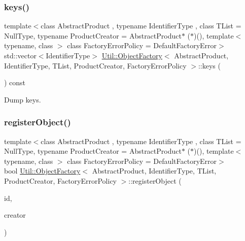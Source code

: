 \subsubsection{\texorpdfstring{keys()}{keys()}\hspace{0.1cm}{\footnotesize\ttfamily [2/2]}}
{\footnotesize\ttfamily template$<$class Abstract\+Product , typename Identifier\+Type , class T\+List  = Null\+Type, typename Product\+Creator  = Abstract\+Product$\ast$ ($\ast$)(), template$<$ typename, class $>$ class Factory\+Error\+Policy = Default\+Factory\+Error$>$ \\
std\+::vector$<$Identifier\+Type$>$ \mbox{\hyperlink{classUtil_1_1ObjectFactory}{Util\+::\+Object\+Factory}}$<$ Abstract\+Product, Identifier\+Type, T\+List, Product\+Creator, Factory\+Error\+Policy $>$\+::keys (\begin{DoxyParamCaption}{ }\end{DoxyParamCaption}) const\hspace{0.3cm}{\ttfamily [inline]}}



Dump keys. 

\mbox{\label{classUtil_1_1ObjectFactory_a2eb2f1fc927e23a1a266aa6fa8c6562a}} 
\subsubsection{\texorpdfstring{registerObject()}{registerObject()}\hspace{0.1cm}{\footnotesize\ttfamily [1/2]}}
{\footnotesize\ttfamily template$<$class Abstract\+Product , typename Identifier\+Type , class T\+List  = Null\+Type, typename Product\+Creator  = Abstract\+Product$\ast$ ($\ast$)(), template$<$ typename, class $>$ class Factory\+Error\+Policy = Default\+Factory\+Error$>$ \\
bool \mbox{\hyperlink{classUtil_1_1ObjectFactory}{Util\+::\+Object\+Factory}}$<$ Abstract\+Product, Identifier\+Type, T\+List, Product\+Creator, Factory\+Error\+Policy $>$\+::register\+Object (\begin{DoxyParamCaption}\item[{const Identifier\+Type \&}]{id,  }\item[{Product\+Creator}]{creator }\end{DoxyParamCaption})\hspace{0.3cm}{\ttfamily [inline]}}



